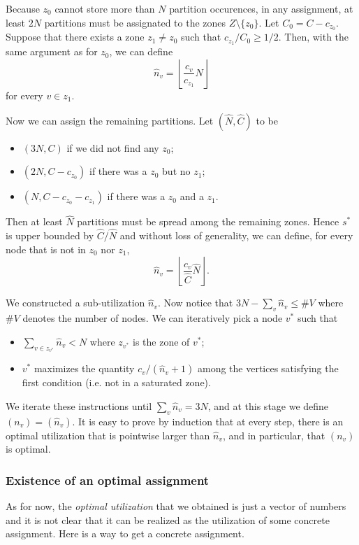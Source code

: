 \documentclass[]{article}
\begin{document}
Because $z_0$ cannot store more than $N$ partition occurences, in any assignment, at least $2N$ partitions must be assignated to the zones $Z\setminus\{z_0\}$. Let $C_0 = C-c_{z_0}$. Suppose that there exists a zone $z_1\neq z_0$ such that $c_{z_1}/C_0 \ge 1/2$. Then, with the same argument as for $z_0$, we can define 
$$\hat{n}_v = \left\lfloor\frac{c_v}{c_{z_1}}N\right\rfloor$$
for every $v\in z_1$.

Now we can assign the remaining partitions. Let $(\hat{N}, \hat{C})$ to be
\begin{itemize}
	\item $(3N,C)$ if we did not find any $z_0$;
	\item $(2N,C-c_{z_0})$ if there was a $z_0$ but no $z_1$;
	\item $(N,C-c_{z_0}-c_{z_1})$ if there was a $z_0$ and a $z_1$.
\end{itemize}
Then at least $\hat{N}$ partitions must be spread among the remaining zones. Hence $s^*$ is upper bounded by $\hat{C}/\hat{N}$ and without loss of generality, we can define, for every node that is not in $z_0$ nor $z_1$, 
$$\hat{n}_v = \left\lfloor\frac{c_v}{\hat{C}}\hat{N}\right\rfloor.$$ 

We constructed a sub-utilization $\hat{n}_v$. Now notice that $3N-\sum_v \hat{n}_v \le \# V$ where $\# V$ denotes the number of nodes. We can iteratively pick a node $v^*$ such that 
\begin{itemize}
	\item $\sum_{v\in z_{v^*}} \hat{n}_v < N$ where $z_{v^*}$ is the zone of $v^*$;
	\item $v^*$ maximizes the quantity $c_v/(\hat{n}_v+1)$ among the vertices satisfying the first condition (i.e. not in a saturated zone).
\end{itemize}
We iterate these instructions until $\sum_v \hat{n}_v= 3N$, and at this stage we define $(n_v) = (\hat{n}_v)$. It is easy to prove by induction that at every step, there is an optimal utilization that is pointwise larger than $\hat{n}_v$, and in particular, that $(n_v)$ is optimal.

\subsubsection*{Existence of an optimal assignment}

As for now, the \emph{optimal utilization} that we obtained is just a vector of numbers and it is not clear that it can be realized as the utilization of some concrete assignment. Here is a way to get a concrete assignment.
\end{document}
